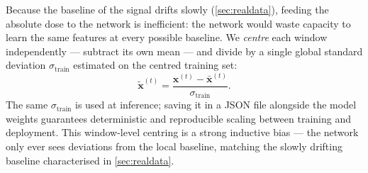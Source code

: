 Because the baseline of the signal drifts slowly
(\cref{sec:realdata}), feeding the absolute dose to the network is
inefficient: the network would waste capacity to learn the same
features at every possible baseline. We \emph{centre} each window
independently --- subtract its own mean --- and divide by a single
global standard deviation $\sigma_{\text{train}}$ estimated on the
centred training set:
\begin{equation}
    \tilde{\mathbf{x}}^{(t)} = \frac{\mathbf{x}^{(t)} - \bar{\mathbf{x}}^{(t)}}{\sigma_{\text{train}}}.
    \label{eq:window-norm}
\end{equation}
The same $\sigma_{\text{train}}$ is used at inference; saving it in a
JSON file alongside the model weights guarantees deterministic and
reproducible scaling between training and deployment. This window-level
centring is a strong inductive bias --- the network only ever sees
deviations from the local baseline, matching the slowly drifting
baseline characterised in \cref{sec:realdata}.
